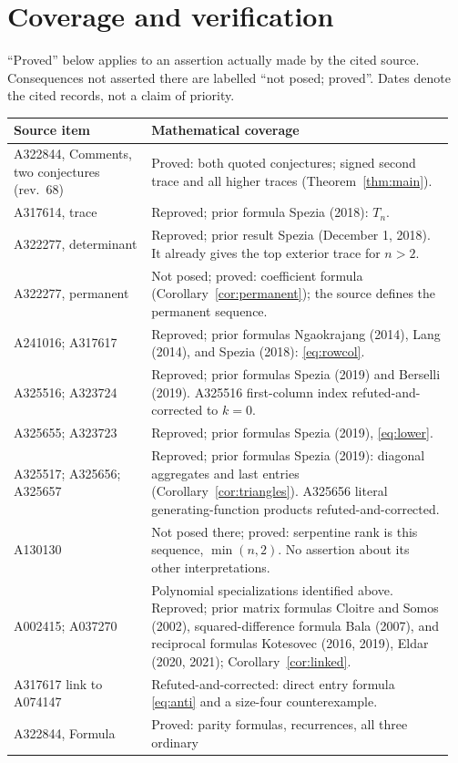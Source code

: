 \documentclass[11pt]{article}
\begin{document}
\section{Coverage and verification}
``Proved'' below applies to an assertion actually made by the cited source.
Consequences not asserted there are labelled ``not posed; proved''.
Dates denote the cited records, not a claim of priority.
\begingroup\small
\begin{longtable}{@{}p{0.30\linewidth}p{0.66\linewidth}@{}}\toprule
Source item & Mathematical coverage\\\midrule
A322844, Comments, two conjectures (rev.\ 68) & Proved: both quoted conjectures;
signed second trace and all higher traces
(Theorem~\ref{thm:main}).\\
A317614, trace & Reproved; prior formula Spezia (2018): $T_n$.\\
A322277, determinant & Reproved; prior result Spezia (December 1, 2018).
It already gives the top exterior trace for $n>2$.\\
A322277, permanent & Not posed; proved: coefficient formula
(Corollary~\ref{cor:permanent}); the source defines the permanent sequence.\\
A241016; A317617 & Reproved; prior formulas Ngaokrajang (2014),
Lang (2014), and Spezia (2018): \eqref{eq:rowcol}.\\
A325516; A323724 & Reproved; prior formulas Spezia (2019) and Berselli (2019).
A325516 first-column index refuted-and-corrected to $k=0$.\\
A325655; A323723 & Reproved; prior formulas Spezia (2019),
\eqref{eq:lower}.\\
A325517; A325656; A325657 & Reproved; prior formulas Spezia (2019):
diagonal aggregates and last entries (Corollary~\ref{cor:triangles}).
A325656 literal generating-function products refuted-and-corrected.\\
A130130 & Not posed there; proved: serpentine rank is this sequence,
$\min(n,2)$. No assertion about its other interpretations.\\
A002415; A037270 & Polynomial specializations identified above.
Reproved; prior matrix formulas Cloitre and Somos (2002), squared-difference
formula Bala (2007), and reciprocal formulas Kotesovec (2016, 2019),
Eldar (2020, 2021); Corollary~\ref{cor:linked}.\\
A317617 link to A074147 & Refuted-and-corrected: direct entry formula
\eqref{eq:anti} and a size-four counterexample.\\
A322844, Formula & Proved: parity formulas, recurrences, all three ordinary

\end{longtable}
\end{document}
